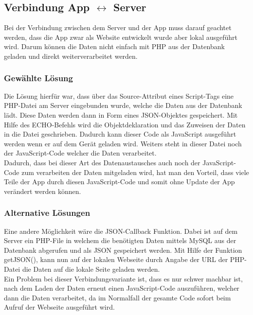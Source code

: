 \subsection{Verbindung App $ \leftrightarrow $ Server}

Bei der Verbindung zwischen dem Server und der App muss darauf geachtet werden, dass die App zwar als Website entwickelt wurde aber lokal ausgeführt wird. Darum können die Daten nicht einfach mit PHP aus der Datenbank geladen und direkt weiterverarbeitet werden.\\

\subsubsection{Gewählte Lösung}
Die Lösung hierfür war, dass über das Source-Attribut eines Script-Tags eine PHP-Datei am Server eingebunden wurde, welche die Daten aus der Datenbank lädt. Diese Daten werden dann in Form eines JSON-Objektes gespeichert. Mit Hilfe des ECHO-Befehls wird die Objektdeklaration und das Zuweisen der Daten in die Datei geschrieben. Dadurch kann dieser Code als JavaScript ausgeführt werden wenn er auf dem Gerät geladen wird. Weiters steht in dieser Datei noch der JavaScript-Code welcher die Daten verarbeitet.\\
Dadurch, dass bei dieser Art des Datenaustausches auch noch der JavaScript-Code zum verarbeiten der Daten mitgeladen wird, hat man den Vorteil, dass viele Teile der App durch diesen JavaScript-Code und somit ohne Update der App verändert werden können.\\

\subsubsection{Alternative Lösungen}
Eine andere Möglichkeit wäre die JSON-Callback Funktion. Dabei ist auf dem Server ein PHP-File in welchem die benötigten Daten mittels MySQL aus der Datenbank abgerufen und als JSON gespeichert werden. 
Mit Hilfe der Funktion getJSON(), kann nun auf der lokalen Webseite durch Angabe der URL der PHP-Datei die Daten auf die lokale Seite geladen werden.\\
Ein Problem bei dieser Verbindungsvariante ist, dass es nur schwer machbar ist, nach dem Laden der Daten erneut einen JavaScript-Code auszuführen, welcher dann die Daten verarbeitet, da im Normalfall der gesamte Code sofort beim Aufruf der Webseite ausgeführt wird.\\

%
